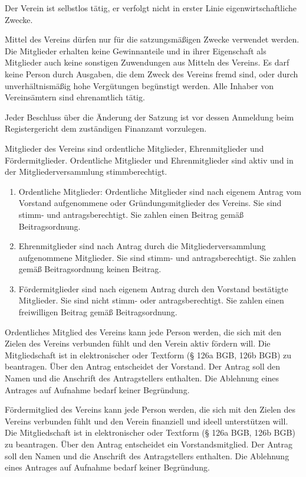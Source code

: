 \documentclass[parskip]{scrartcl}
\begin{document}
\begin{contract}
Der Verein ist selbstlos tätig, er verfolgt nicht in erster Linie eigenwirtschaftliche Zwecke.

Mittel des Vereins dürfen nur für die satzungsmäßigen Zwecke verwendet werden. Die Mitglieder erhalten keine Gewinnanteile und in ihrer Eigenschaft als Mitglieder auch keine sonstigen Zuwendungen aus Mitteln des Vereins. Es darf keine Person durch Ausgaben, die dem Zweck des Vereins fremd sind, oder durch unverhältnismäßig hohe Vergütungen begünstigt werden. Alle Inhaber von Vereinsämtern sind ehrenamtlich tätig.

Jeder Beschluss über die Änderung der Satzung ist vor dessen Anmeldung beim Registergericht dem zuständigen Finanzamt vorzulegen.


Mitglieder des Vereins sind ordentliche Mitglieder, Ehrenmitglieder und Fördermitglieder. Ordentliche Mitglieder und Ehrenmitglieder sind aktiv und in der Mitgliederversammlung stimmberechtigt.

\begin{enumerate}
\item Ordentliche Mitglieder: Ordentliche Mitglieder sind nach eigenem Antrag vom Vorstand aufgenommene oder Gründungsmitglieder des Vereins. Sie sind stimm- und antragsberechtigt. Sie zahlen einen Beitrag gemäß Beitragsordnung.
\item Ehrenmitglieder sind nach Antrag durch die Mitgliederversammlung aufgenommene Mitglieder. Sie sind stimm- und antragsberechtigt. Sie zahlen gemäß Beitragsordnung keinen Beitrag.
\item Fördermitglieder sind nach eigenem Antrag durch den Vorstand bestätigte Mitglieder. Sie sind nicht stimm- oder antragsberechtigt. Sie zahlen einen freiwilligen Beitrag gemäß Beitragsordnung.
\end{enumerate}

Ordentliches Mitglied des Vereins kann jede Person werden, die sich mit den Zielen des Vereins verbunden fühlt und den Verein aktiv fördern will. Die Mitgliedschaft ist in elektronischer oder Textform (§ 126a BGB, 126b BGB) zu beantragen. Über den Antrag entscheidet der Vorstand. Der Antrag soll den Namen und die Anschrift des Antragstellers enthalten. Die Ablehnung eines Antrages auf Aufnahme bedarf keiner Begründung.

Fördermitglied des Vereins kann jede Person werden, die sich mit den Zielen des Vereins verbunden fühlt und den Verein finanziell und ideell unterstützen will. Die Mitgliedschaft ist in elektronischer oder Textform (§ 126a BGB, 126b BGB) zu beantragen. Über den Antrag entscheidet ein Vorstandsmitglied. Der Antrag soll den Namen und die Anschrift des Antragstellers enthalten. Die Ablehnung eines Antrages auf Aufnahme bedarf keiner Begründung.


\end{contract}
\end{document}

